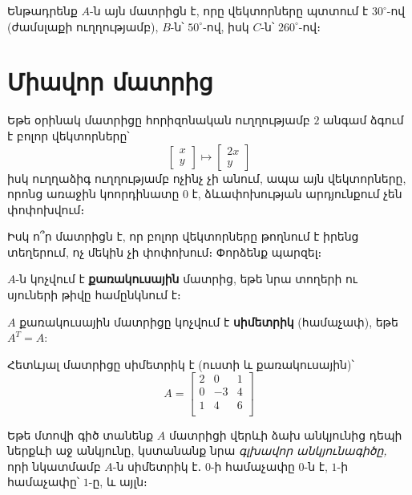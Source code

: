 Ենթադրենք $A$-ն այն մատրիցն է, որը վեկտորները պտտում է $30^\circ$-ով (ժամսլաքի ուղղությամբ),  $B$-ն՝ $50^\circ$-ով, իսկ $C$-ն՝ $260^\circ$-ով։




\section{Միավոր մատրից}

Եթե օրինակ մատրիցը հորիզոնական ուղղությամբ $2$ անգամ ձգում է բոլոր վեկտորները՝
\[
\begin{bmatrix}
    x \\ y
\end{bmatrix}
\mapsto 
\begin{bmatrix}
    2x \\ y
\end{bmatrix}
\]
իսկ ուղղաձիգ ուղղությամբ ոչինչ չի անում, ապա  այն վեկտորները, որոնց առաջին կոորդինատը $0$ է, ձևափոխության արդյունքում չեն փոփոխվում։

Իսկ ո՞ր մատրիցն է, որ բոլոր վեկտորները թողնում է իրենց տեղերում, ոչ մեկին չի փոփոխում։ Փորձենք պարզել։

\begin{definition}
$A$-ն կոչվում է \textbf{քառակուսային} մատրից, եթե նրա տողերի ու սյուների թիվը համընկնում է։
\end{definition}

\begin{definition}
$A$ քառակուսային մատրիցը կոչվում է \textbf{սիմետրիկ} (համաչափ), եթե $A^T=A$:
\end{definition}

\begin{example} 
Հետևյալ մատրիցը սիմետրիկ է (ուստի և քառակուսային)՝
\[
A = \begin{bmatrix}
2 & 0 & 1 \\
0 & -3 & 4 \\
1 & 4 & 6 \\
\end{bmatrix}
\]
\end{example}

Եթե մտովի գիծ տանենք $A$ մատրիցի վերևի ձախ անկյունից դեպի ներքևի աջ անկյունը, կստանանք նրա \textit{գլխավոր անկյունագիծը,} որի նկատմամբ $A$-ն սիմետրիկ է․ $0$-ի համաչափը $0$-ն է, $1$-ի համաչափը՝ $1$-ը, և այլն։

